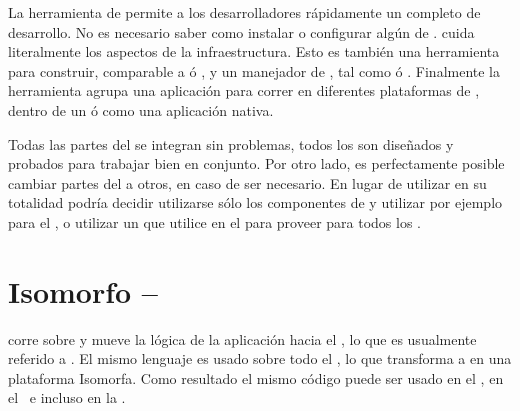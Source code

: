 La herramienta \clitool de \meteor permite a los desarrolladores rápidamente \setup un \environment completo de desarrollo. No es necesario saber como instalar o configurar algún \software de \server. \meteor cuida literalmente los aspectos de la infraestructura. Esto es también una herramienta para construir, comparable a \maketool ó \grunttool, y un manejador de \package, tal como \apttool ó \npm. Finalmente la herramienta \clitool agrupa una aplicación para correr en diferentes plataformas de \clients, dentro de un \browser \web ó como una aplicación \mobile nativa.

Todas las partes del \stack se integran sin problemas, todos los \packages \core son diseñados y probados para trabajar bien en conjunto. Por otro lado, es perfectamente posible cambiar partes del \stack a otros, en caso de ser necesario. En lugar de utilizar \meteor en su totalidad podría decidir utilizarse sólo los componentes de \serverAS y utilizar por ejemplo \angularjs para el \clientSide, o utilizar un \javabackend que utilice \meteor en el \frontend para proveer \updates \realtime para todos los \clients.

\section{\framework Isomorfo – \fullstack \javaScript}

\meteor corre sobre \nodejs y mueve la lógica de la aplicación hacia el \browser, lo que es usualmente referido a \singlePageApp. El mismo lenguaje es usado sobre todo el \stack, lo que transforma a \meteor en una plataforma Isomorfa. Como resultado el mismo código \javaScript puede ser usado en el \server, en el \client\, e incluso en la \dataBase.

